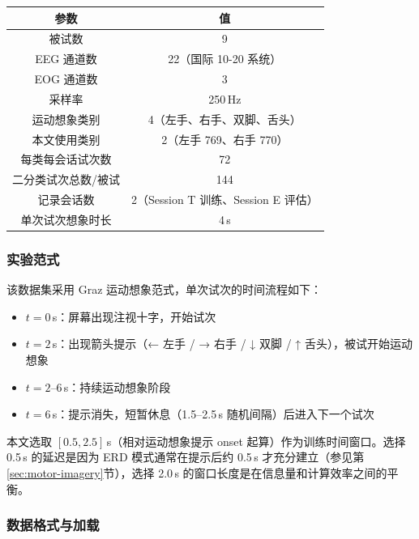 \begin{table}[htbp]
	\centering
	\begin{tabular}{cc}
		\toprule
		参数 & 值 \\
		\midrule
		被试数 & 9 \\
		EEG 通道数 & 22（国际 10-20 系统） \\
		EOG 通道数 & 3 \\
		采样率 & 250\,Hz \\
		运动想象类别 & 4（左手、右手、双脚、舌头） \\
		本文使用类别 & 2（左手 769、右手 770） \\
		每类每会话试次数 & 72 \\
		二分类试次总数/被试 & 144 \\
		记录会话数 & 2（Session T 训练、Session E 评估） \\
		单次试次想象时长 & 4\,s \\
		\bottomrule
	\end{tabular}
\end{table}

\subsubsection{实验范式}

该数据集采用 Graz 运动想象范式，单次试次的时间流程如下：

\begin{itemize}[leftmargin=2em]
	\item $t = 0$\,s：屏幕出现注视十字，开始试次
	\item $t = 2$\,s：出现箭头提示（← 左手 / → 右手 / ↓ 双脚 / ↑ 舌头），被试开始运动想象
	\item $t = 2\text{--}6$\,s：持续运动想象阶段
	\item $t = 6$\,s：提示消失，短暂休息（1.5--2.5\,s 随机间隔）后进入下一个试次
\end{itemize}

本文选取 $[0.5, 2.5]$\,s（相对运动想象提示 onset 起算）作为训练时间窗口。选择 0.5\,s 的延迟是因为 ERD 模式通常在提示后约 0.5\,s 才充分建立（参见第\ref{sec:motor-imagery}节），选择 2.0\,s 的窗口长度是在信息量和计算效率之间的平衡。

\subsubsection{数据格式与加载}

